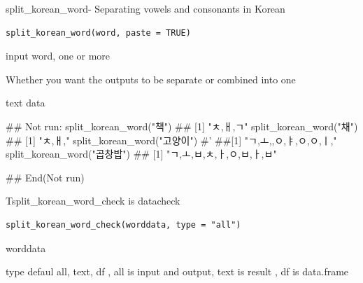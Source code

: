 \documentclass[a4paper]{book}
\begin{document}
%
\begin{Description}
split\_korean\_word- Separating vowels and consonants in Korean
\end{Description}
%
\begin{Usage}
\begin{verbatim}
split_korean_word(word, paste = TRUE)
\end{verbatim}
\end{Usage}
%
\begin{Arguments}
\begin{ldescription}
\item[\code{word}] input word, one or more

\item[\code{paste}] Whether you want the outputs to be separate or combined into one
\end{ldescription}
\end{Arguments}
%
\begin{Value}
text data
\end{Value}
%
\begin{Examples}
\begin{ExampleCode}
\#\# Not run: 
split_korean_word("책")
## [1] "ㅊ,ㅐ,ㄱ"
split_korean_word("채")
## [1] "ㅊ,ㅐ,"
split_korean_word("고양이")
#' ##[1] "ㄱ,ㅗ,,ㅇ,ㅑ,ㅇ,ㅇ,ㅣ,"
split_korean_word("곱창밥")
## [1] "ㄱ,ㅗ,ㅂ,ㅊ,ㅏ,ㅇ,ㅂ,ㅏ,ㅂ"

## End(Not run)

\end{ExampleCode}
\end{Examples}
%
\begin{Description}
Tsplit\_korean\_word\_check is datacheck
\end{Description}
%
\begin{Usage}
\begin{verbatim}
split_korean_word_check(worddata, type = "all")
\end{verbatim}
\end{Usage}
%
\begin{Arguments}
\begin{ldescription}
\item[\code{worddata}] worddata

\item[\code{type}] type defaul all, text, df , all is input and output, text is result , df is data.frame
\end{ldescription}
\end{Arguments}
\end{document}
